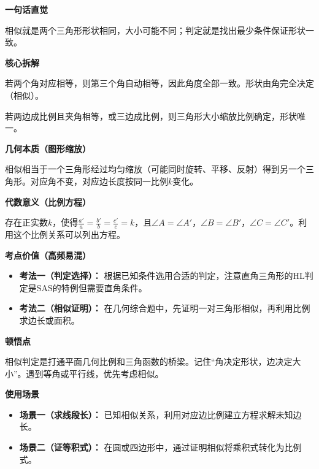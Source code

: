 \begin{explanationbox}
	\textbf{\textcolor{CExplanation}{一句话直觉}}

	相似就是两个三角形形状相同，大小可能不同；判定就是找出最少条件保证形状一致。

	\medskip
	\textbf{\textcolor{CExplanation}{核心拆解}}
	\begin{description}[style=nextline, leftmargin=2.8em, labelsep=0.5em, itemsep=0.45em]
		\item[\textbf{要点一（角度一致性）：}] 若两个角对应相等，则第三个角自动相等，因此角度全部一致。形状由角完全决定（相似）。
		\item[\textbf{要点二（边比例固定）：}] 若两边成比例且夹角相等，或三边成比例，则三角形大小缩放比例确定，形状唯一。
	\end{description}

	\medskip
	\textbf{\textcolor{CExplanation}{几何本质（图形缩放）}}

	相似相当于一个三角形经过均匀缩放（可能同时旋转、平移、反射）得到另一个三角形。对应角不变，对应边长度按同一比例$k$变化。

	\medskip
	\textbf{\textcolor{CExplanation}{代数意义（比例方程）}}

	存在正实数$k$，使得$\frac{a'}{a}=\frac{b'}{b}=\frac{c'}{c}=k$，且$\angle A=\angle A'$，$\angle B=\angle B'$，$\angle C=\angle C'$。利用这个比例关系可以列出方程。

	\medskip
	\textbf{\textcolor{CExplanation}{考点价值（高频易混）}}
	\begin{itemize}[leftmargin=*, itemsep=0.5em, topsep=0.4em]
		\item \textbf{考法一（判定选择）：} 根据已知条件选用合适的判定，注意直角三角形的HL判定是SAS的特例但需要直角条件。
		\item \textbf{考法二（相似证明）：} 在几何综合题中，先证明一对三角形相似，再利用比例求边长或面积。
	\end{itemize}

	\medskip
	\textbf{\textcolor{CExplanation}{顿悟点}}

	相似判定是打通平面几何比例和三角函数的桥梁。记住“角决定形状，边决定大小”。遇到等角或平行线，优先考虑相似。

	\medskip
	\textbf{\textcolor{CExplanation}{使用场景}}
	\begin{itemize}[leftmargin=*, itemsep=0.5em, topsep=0.4em]
		\item \textbf{场景一（求线段长）：} 已知相似关系，利用对应边比例建立方程求解未知边长。
		\item \textbf{场景二（证等积式）：} 在圆或四边形中，通过证明相似将乘积式转化为比例式。
	\end{itemize}
\end{explanationbox}
